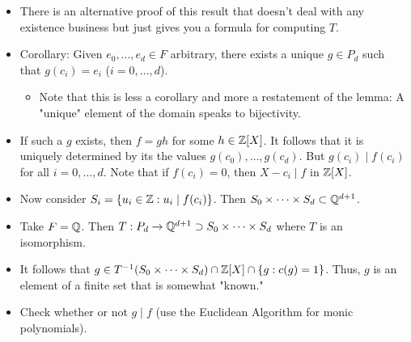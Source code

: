 \documentclass[../notes.tex]{subfiles}
\begin{document}
\begin{itemize}
    \begin{equation*}
        T(g) = (g(c_0),\dots,g(c_d))
    \end{equation*}
    is an isomorphism of $F$-vector spaces.
    \begin{proof}
        $P_d$ and $F^{d+1}$ both have the same dimension. Thus, to prove bijectivity of this linear transformation, it will suffice to prove injectivity. To do so, we will show that $\ker(T)=\{0\}$. Let $g\in\ker(T)$ be arbitrary. Then
        \begin{align*}
            T(g) &= 0\\
            (g(c_0),\dots,g(c_d)) &= (0,\dots,0)
        \end{align*}
        Thus, $g$ has $d+1$ distinct roots $c_0,\dots,c_d$. It follows that $g\in((X-c_0)\dots(X-c_d))$, meaning that $g=0$ or $\deg(g)\geq d+1$. However, $g\in P_d$ by hypothesis as well, meaning $\deg(g)\leq d$. Therefore, $g=0$, as desired.
    \end{proof}
    \item There is an alternative proof of this result that doesn't deal with any existence business but just gives you a formula for computing $T$.
    \item Corollary: Given $e_0,\dots,e_d\in F$ arbitrary, there exists a unique $g\in P_d$ such that $g(c_i)=e_i$ ($i=0,\dots,d$).
    \begin{itemize}
        \item Note that this is less a corollary and more a restatement of the lemma: A "unique" element of the domain speaks to bijectivity.
    \end{itemize}
    \item If such a $g$ exists, then $f=gh$ for some $h\in\mathbb{Z}[X]$. It follows that it is uniquely determined by its the values $g(c_0),\dots,g(c_d)$. But $g(c_i)\mid f(c_i)$ for all $i=0,\dots,d$. Note that if $f(c_i)=0$, then $X-c_i\mid f$ in $\mathbb{Z}[X]$.
    \item Now consider $S_i=\{u_i\in\mathbb{Z}:u_i\mid f(c_i)\}$. Then $S_0\times\cdots\times S_d\subset\mathbb{Q}^{d+1}$.
    \item Take $F=\mathbb{Q}$. Then $T:P_d\to\mathbb{Q}^{d+1}\supset S_0\times\cdots\times S_d$ where $T$ is an isomorphism.
    \item It follows that $g\in T^{-1}(S_0\times\cdots\times S_d)\cap\mathbb{Z}[X]\cap\{g:c(g)=1\}$. Thus, $g$ is an element of a finite set that is somewhat "known."
    \item Check whether or not $g\mid f$ (use the Euclidean Algorithm for monic polynomials).

\end{itemize}
\end{document}
